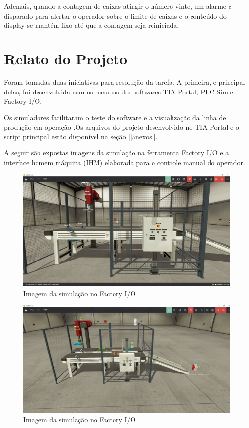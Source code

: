 \documentclass[
	12pt,				%
	openright,			%
	oneside,			%
	a4paper,			%
	english,			%
	brazil,				%
	]{abntex2}
\begin{document}
Ademais, quando a contagem de caixas atingir o número vinte, um alarme é disparado para alertar o operador sobre o limite de caixas e o conteúdo do display se mantém fixo até que a contagem seja reiniciada.

\chapter{Relato do Projeto}

Foram tomadas duas iniciativas para resolução da tarefa. A primeira, e principal delas, foi desenvolvida com os recursos dos softwares TIA Portal, PLC Sim e Factory I/O. 

Os simuladores facilitaram o teste do software e a visualização da linha de produção em operação .Os arquivos do projeto desenvolvido no TIA Portal e o script principal estão disponível na seção [\ref{anexos}].

A seguir são expostas imagens da simulação na ferramenta Factory I/O e a interface homem máquina (IHM) elaborada para o controle manual do operador. 

\begin{figure}[H]
\centering
\includegraphics[width=1\linewidth]{Imagens/i2.jpeg}
\caption{Imagem da simulação no Factory I/O}
\label{fig:simulaçao_1}
\end{figure}

\begin{figure}[H]
\centering
\includegraphics[width=1\linewidth]{Imagens/i3.jpeg}
\caption{Imagem da simulação no Factory I/O}
\label{fig:simulaçao_2}
\end{figure}
\end{document}
